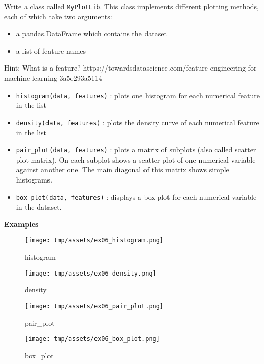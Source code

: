 \documentclass[]{article}
\begin{document}
Write a class called \texttt{MyPlotLib}. This class implements different
plotting methods, each of which take two arguments:

\begin{itemize}
\item
  a pandas.DataFrame which contains the dataset
\item
  a list of feature names
\end{itemize}

Hint: What is a feature?
https://towardsdatascience.com/feature-engineering-for-machine-learning-3a5e293a5114

\begin{itemize}
\item
  \texttt{histogram(data,\ features)} : plots one histogram for each
  numerical feature in the list
\item
  \texttt{density(data,\ features)} : plots the density curve of each
  numerical feature in the list
\item
  \texttt{pair\_plot(data,\ features)} : plots a matrix of subplots
  (also called scatter plot matrix). On each subplot shows a scatter
  plot of one numerical variable against another one. The main diagonal
  of this matrix shows simple histograms.
\item
  \texttt{box\_plot(data,\ features)} : displays a box plot for each
  numerical variable in the dataset.
\end{itemize}

\textbf{Examples}

\begin{figure}
\centering
\texttt{[image: tmp/assets/ex06\_histogram.png]}
\caption{histogram}
\end{figure}

\begin{figure}
\centering
\texttt{[image: tmp/assets/ex06\_density.png]}
\caption{density}
\end{figure}

\begin{figure}
\centering
\texttt{[image: tmp/assets/ex06\_pair\_plot.png]}
\caption{pair\_plot}
\end{figure}

\begin{figure}
\centering
\texttt{[image: tmp/assets/ex06\_box\_plot.png]}
\caption{box\_plot}
\end{figure}
\end{document}

